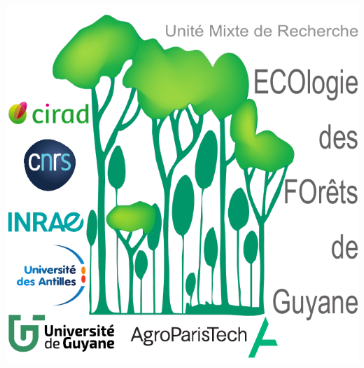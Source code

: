 \documentclass[
  11pt,
  french,
  a4paper,
  extrafontsizes,onecolumn,openright
  ]{memoir}
\begin{document}
\vspace*{\fill}
\centering\includegraphics[width=.3\textwidth]{images/Logo-Lab}
\end{document}
